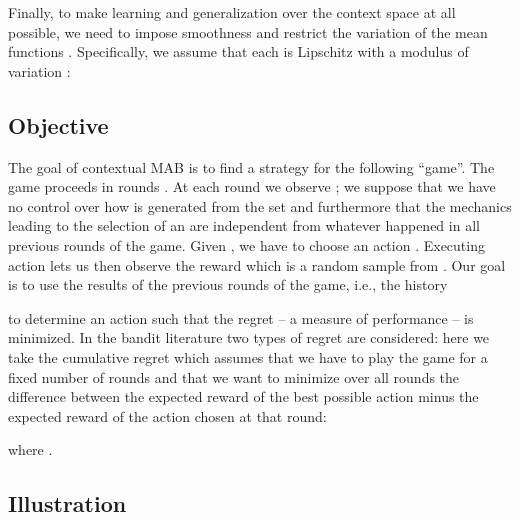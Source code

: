 \documentclass{llncs}
\begin{document}
Finally, to make learning and generalization over the context space at all 
possible, we need to impose smoothness and restrict the variation of the
mean functions . Specifically, we assume that each  is 
Lipschitz with a modulus of variation :


\subsection{Objective} 
The goal of contextual MAB is to find a strategy for the following ``game''. 
The game proceeds in rounds . At each round 
we observe ; we suppose that we have no control over how
 is generated from the set  and furthermore that the 
mechanics leading to the selection of an  are independent from 
whatever happened in all previous rounds of the game. Given , we have
to choose an action . Executing action 
lets us then observe the reward  which is a random sample 
from . Our goal is to use the results of the 
previous rounds of the game, i.e., the history 

to determine an action  such that the regret -- a measure of performance --
is minimized.   
In the bandit literature two types of  regret are considered:
here we take the cumulative regret which assumes that we have to play the game 
for a fixed number  of rounds
and that we want to minimize over all  rounds the difference between
the expected reward of the best possible action minus
the expected reward of the action chosen at that round:
 
where . 


\subsection{Illustration} 

\end{document}
